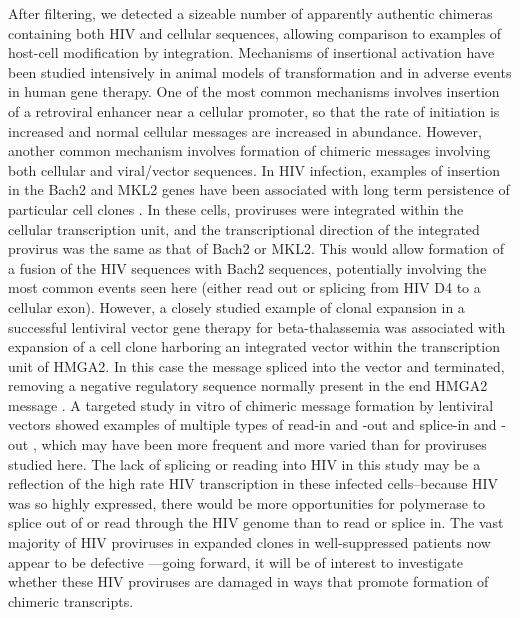 \documentclass[../sherrill-Mix_thesis.tex]{subfiles}
\begin{document}
	After filtering, we detected a sizeable number of apparently authentic chimeras containing both HIV and cellular sequences, allowing comparison to examples of host-cell modification by integration. Mechanisms of insertional activation have been studied intensively in animal models of transformation and in adverse events in human gene therapy. One of the most common mechanisms involves insertion of a retroviral enhancer near a cellular promoter, so that the rate of initiation is increased and normal cellular messages are increased in abundance. However, another common mechanism involves formation of chimeric messages involving both cellular and viral/vector sequences. In HIV infection, examples of insertion in the Bach2 and MKL2 genes have been associated with long term persistence of particular cell clones \citep{Ikeda2007,Maldarelli2014,Wagner2014,Cohn2015}. In these cells, proviruses were integrated within the cellular transcription unit, and the transcriptional direction of the integrated provirus was the same as that of Bach2 or MKL2. This would allow formation of a fusion of the \fivePrime{} HIV sequences with \threePrime{} Bach2 sequences, potentially involving the most common events seen here (either \threePrime{} read out or splicing from HIV D4 to a cellular exon). However, a closely studied example of clonal expansion in a successful lentiviral vector gene therapy for beta-thalassemia was associated with expansion of a cell clone harboring an integrated vector within the transcription unit of HMGA2. In this case the message spliced into the vector and terminated, removing a negative regulatory sequence normally present in the \threePrime{} end HMGA2 message \citep{Cavazzana-Calvo2010}. A targeted study in vitro of chimeric message formation by lentiviral vectors showed examples of multiple types of read-in and -out and splice-in and -out \citep{Moiani2012}, which may have been more frequent and more varied than for \hivEight{} proviruses studied here. The lack of splicing or reading into HIV in this study may be a reflection of the high rate HIV transcription in these infected cells--because HIV was so highly expressed, there would be more opportunities for polymerase to splice out of or read through the HIV genome than to read or splice in. The vast majority of HIV proviruses in expanded clones in well-suppressed patients now appear to be defective \citep{Cohn2015}---going forward, it will be of interest to investigate whether these HIV proviruses are damaged in ways that promote formation of chimeric transcripts. 
\end{document}
